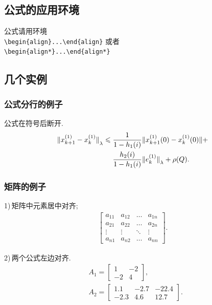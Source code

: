 \documentclass{ctacn}%
\begin{document}
\begin{multicols}{2}
\subsection{公式的应用环境}
公式请用环境\\
\verb|\begin{align}...\end{align}|
或者\\
\verb|\begin{align*}...\end{align*}|%
\subsection{几个实例}

\subsubsection{公式分行的例子}
公式在符号后断开.
\begin{align}
{\Arrowvert x^{(1)}_{k+1}-x^{(1)}_k\Arrowvert}_\lambda\leqslant \;&
\frac{1}{1-h_1(i)}\Arrowvert x^{(1)}_{k+1}(0)-x^{(1)}_k(0)\Arrowvert+\notag\\
&\frac{h_2(i)}{1-h_1(i)}{\Arrowvert
	e^{(1)}_k\Arrowvert}_\lambda+\rho(Q).
\end{align}


\subsubsection{矩阵的例子}
1)\,矩阵中元素居中对齐;
\begin{align}
\left[\begin{array}{cccc}
a_{11}& a_{12}&\dots &a_{1n}\\
a_{21}& a_{22}&\dots &a_{2n}\\
\vdots&\vdots& \ddots   &\vdots\\
a_{n1}& a_{n2}&\dots &a_{nn}
\end{array}\right].\end{align}

2)\,两个公式左边对齐.
\begin{align}
&A_1=\left[\begin{array}{cc} 1& -2\\-2 &4
\end{array}\right],\\
&A_2=\left[\begin{array}{ccc} 1.1 &-2.7&-22.4\\-2.3 &4.6 &12.7
\end{array}\right].
\end{align}



\end{multicols}
\end{document}
